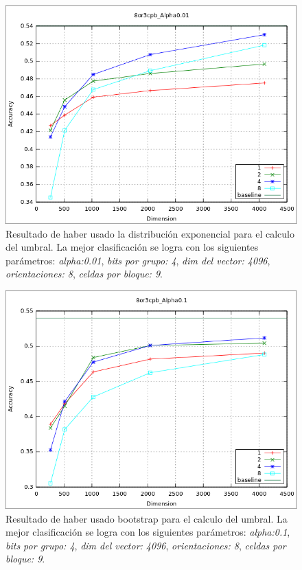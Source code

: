 			\begin{figure}[htbp]
				\centering
				\includegraphics[scale=0.6]{img/resultados/reales/expon_8or3cpb_Alpha0,01.png}
				\caption[Reales con umbral exponencial]{Resultado de haber usado la distribución exponencial para el calculo del umbral. La mejor clasificación se logra con los siguientes parámetros: \textit{alpha:0.01}, \textit{bits por grupo: 4}, \textit{dim del vector: 4096}, \textit{orientaciones: 8}, \textit{celdas por bloque: 9}.}
				\label{fig: Reales-expon-8or9cpbAlph0.01}
			\end{figure}
			
			\begin{figure}[htbp]
				\centering
				\includegraphics[scale=0.6]{img/resultados/reales/bootstrap_8or3cpb_Alpha0,1.png}
				\caption[Reales con umbral boostrap]{Resultado de haber usado bootstrap para el calculo del umbral. La mejor clasificación se logra con los siguientes parámetros: \textit{alpha:0.1}, \textit{bits por grupo: 4}, \textit{dim del vector: 4096}, \textit{orientaciones: 8}, \textit{celdas por bloque: 9}.}
				\label{fig: Reales-bootstrap-8or9cpbAlph0.1}
			\end{figure}
			
